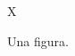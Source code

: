 \documentclass{article}
\begin{document}
\begin{figure}
\centering X
\caption{Una figura.}
\end{figure}
\end{document}
